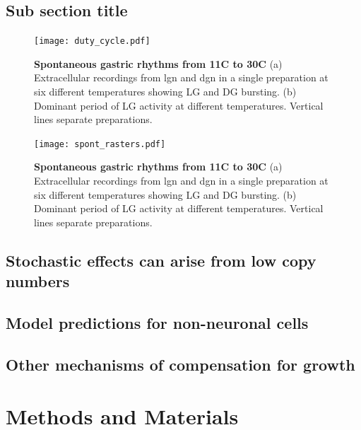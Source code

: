 \documentclass[9pt,lineno]{elife}
\begin{document}
\subsection{Sub section title}

\lipsum[2]


\begin{figure}
\begin{fullwidth}
\texttt{[image: duty\_cycle.pdf]}

\caption{\textbf{Spontaneous gastric rhythms from 11C to 30C} (a) Extracellular recordings from lgn and dgn in a single preparation at six different temperatures showing LG and DG bursting. (b)  Dominant period of LG activity at different temperatures. Vertical lines separate preparations.  } 
\label{fig:9}
\end{fullwidth}
\end{figure}


\begin{figure}
\begin{fullwidth}
\texttt{[image: spont\_rasters.pdf]}

\caption{\textbf{Spontaneous gastric rhythms from 11C to 30C} (a) Extracellular recordings from lgn and dgn in a single preparation at six different temperatures showing LG and DG bursting. (b)  Dominant period of LG activity at different temperatures. Vertical lines separate preparations.  } 
\label{fig:9}
\end{fullwidth}
\end{figure}

\subsection{Stochastic effects can arise from low copy numbers}

\lipsum[3]

\subsection{Model predictions for non-neuronal cells}

\lipsum[2]

\subsection{Other mechanisms of compensation for growth}

\lipsum[5-6]




\section{Methods and Materials}
\end{document}
